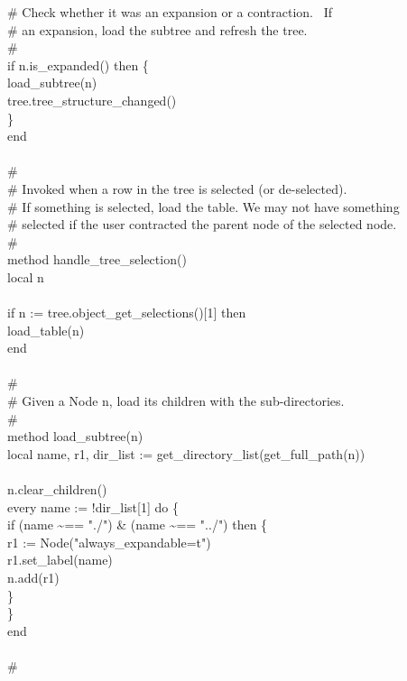 {\>\>\# Check whether it was an expansion or a contraction. \ If \\
\>\>\# an expansion, load the subtree and refresh the tree. \\
\>\>\# \\
\>\>if n.is\_expanded() then \{ \\
\>\>\>load\_subtree(n) \\
\>\>\>tree.tree\_structure\_changed() \\
\>\>\>\} \\
\>end \\
\ \\
\>\# \\
\>\# Invoked when a row in the tree is selected (or de-selected). \\
\>\# If something is selected, load the table. We may not have something\\
\>\# selected if the user contracted the parent node of the selected node. \\
\>\# \\
\>method handle\_tree\_selection() \\
\>\>local n \\
\\
\>\>if n := tree.object\_get\_selections()[1] then \\
\>\>\>load\_table(n) \\
\>end \\
\ \\
\>\# \\
\>\# Given a Node n, load its children with the sub-directories. \\
\>\# \\
\>method load\_subtree(n) \\
\>\>local name, r1, dir\_list := get\_directory\_list(get\_full\_path(n)) \\
\\
\>\>n.clear\_children() \\
\>\>every name := !dir\_list[1] do \{ \\
\>\>\>if (name \~{}== "./") \& (name \~{}== "../") then \{ \\
\>\>\>\>r1 := Node("always\_expandable=t") \\
\>\>\>\>r1.set\_label(name) \\
\>\>\>\>n.add(r1) \\
\>\>\>\>\} \\
\>\>\>\} \\
\>end \\
\ \\
\>\# \\
}
